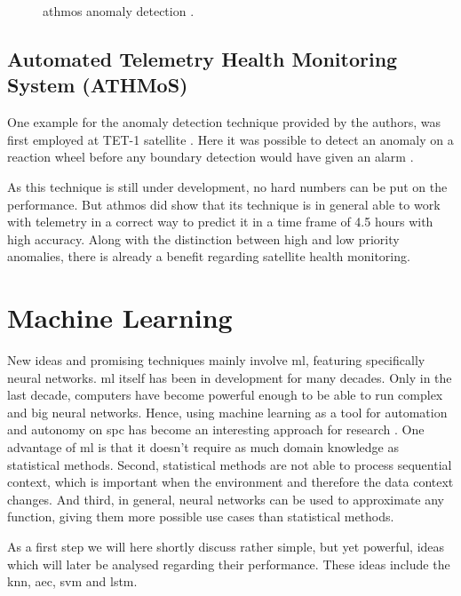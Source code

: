 \begin{figure}[htb]
\centering

\caption{\ac{athmos} anomaly detection \cite[p. 8]{athmos}.}
\label{f:athmos_anomaly}
\end{figure}

	\subsection{Automated Telemetry Health Monitoring System (ATHMoS)}
	One example for the anomaly detection technique provided by the authors, was first employed at TET-1 satellite \cite{tet}. Here it was possible to detect an anomaly on a reaction wheel before any boundary detection would have given an alarm \cite[p. 11f]{athmos-sub}.
	
	As this technique is still under development, no hard numbers can be put on the performance. But \ac{athmos} did show that its technique is in general able to work with telemetry in a correct way to predict it in a time frame of 4.5 hours with high accuracy. Along with the distinction between high and low priority anomalies, there is already a benefit regarding satellite health monitoring.

\section{Machine Learning}
\label{c:new_techniques}
New ideas and promising techniques mainly involve \acf{ml}, featuring specifically neural networks. \ac{ml} itself has been in development for many decades. Only in the last decade, computers have become powerful enough to be able to run complex and big neural networks. Hence, using machine learning as a tool for automation and autonomy on \ac{spc} has become an interesting approach for research \cite{ai-dlr-survey}. \newline 
One advantage of \ac{ml} is that it doesn't require as much domain knowledge as statistical methods. Second, statistical methods are not able to process sequential context, which is important when the environment and therefore the data context changes. And third, in general, neural networks can be used to approximate any function, giving them more possible use cases than statistical methods.

As a first step we will here shortly discuss rather simple, but yet powerful, ideas which will later be analysed regarding their performance. These ideas include the \acf{knn}, \acf{aec}, \acf{svm} and \acf{lstm}.

